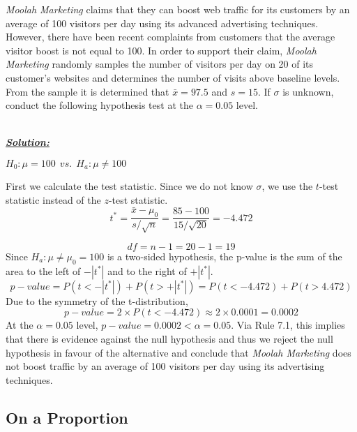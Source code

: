 \begin{example}
\textit{Moolah Marketing} claims that they can boost web traffic for its customers by an average of 100 visitors per day using its advanced advertising techniques. However, there have been recent complaints from customers that the average visitor boost is not equal to 100. In order to support their claim, \textit{Moolah Marketing} randomly samples the number of visitors per day on 20 of its customer's websites and determines the number of visits above baseline levels. From the sample it is determined that $\bar{x}=97.5$ and $s=15$. If $\sigma$ is unknown, conduct the following hypothesis test at the $\alpha = 0.05$ level.


\hfill\\
{\emph{\textbf{\underline{Solution:}}}}


\begin{center}
$H_0: \mu = 100 ~~vs.~~ H_a: \mu \neq 100$
\end{center}
First we calculate the test statistic. Since we do not know $\sigma$, we use the $t$-test statistic instead of the $z$-test statistic.
\[ t^{*} = \frac{\bar{x}-\mu_0}{s/\sqrt{n}} = \frac{85-100}{15/\sqrt{20}} = -4.472 \]

\[ df = n-1 = 20-1 = 19\]
Since $H_a: \mu \neq \mu_0 = 100$ is a two-sided hypothesis, the p-value is the sum of the area to the left of $-|t^*|$ and to the right of $+|t^{*}|$. 
\[ p-value = P(t< -|t^{*}|)+ P(t> +|t^{*}|) = P(t < -4.472) + P(t > 4.472)\]
Due to the symmetry of the t-distribution,
\[ p-value = 2 \times P(t < -4.472) \approx 2 \times 0.0001 = 0.0002\]
At the $\alpha=0.05$ level, $p-value = 0.0002 < \alpha=0.05$. Via Rule 7.1, this implies that there is evidence against the null hypothesis and thus we reject the null hypothesis in favour of the alternative and conclude that \textit{Moolah Marketing} does not boost traffic by an average of 100 visitors per day using its advertising techniques. 
\end{example}









\subsection{On a Proportion}

